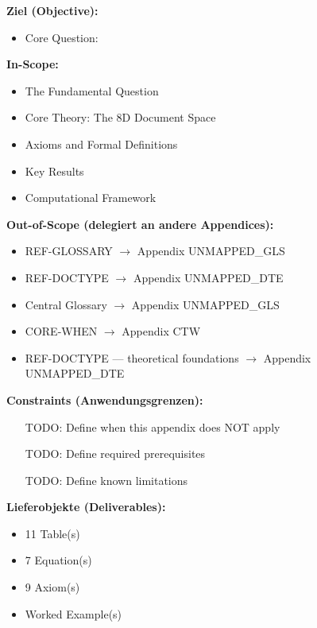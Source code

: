 \begin{tcolorbox}[
    colback=orange!5!white,
    colframe=orange!75!black,
    title={\textbf{Appendix Scope: Ziel / In-Scope / Out-of-Scope / Constraints}},
    fonttitle=\bfseries
]

\textbf{Ziel (Objective):}
\begin{itemize}[nosep]
    \item Core Question:
\end{itemize}

\textbf{In-Scope:}
\begin{itemize}[nosep]
    \item The Fundamental Question
    \item Core Theory: The 8D Document Space
    \item Axioms and Formal Definitions
    \item Key Results
    \item Computational Framework
\end{itemize}

\textbf{Out-of-Scope (delegiert an andere Appendices):}
\begin{itemize}[nosep]
    \item REF-GLOSSARY $\rightarrow$ Appendix UNMAPPED_GLS
    \item REF-DOCTYPE $\rightarrow$ Appendix UNMAPPED_DTE
    \item Central Glossary $\rightarrow$ Appendix UNMAPPED_GLS
    \item CORE-WHEN $\rightarrow$ Appendix CTW
    \item REF-DOCTYPE --- theoretical foundations $\rightarrow$ Appendix UNMAPPED_DTE
\end{itemize}

\textbf{Constraints (Anwendungsgrenzen):}
\begin{itemize}[nosep]
    \item [TODO: Define when this appendix does NOT apply]
    \item [TODO: Define required prerequisites]
    \item [TODO: Define known limitations]
\end{itemize}

\textbf{Lieferobjekte (Deliverables):}
\begin{itemize}[nosep]
    \item 11 Table(s)
    \item 7 Equation(s)
    \item 9 Axiom(s)
    \item Worked Example(s)
\end{itemize}

\end{tcolorbox}




